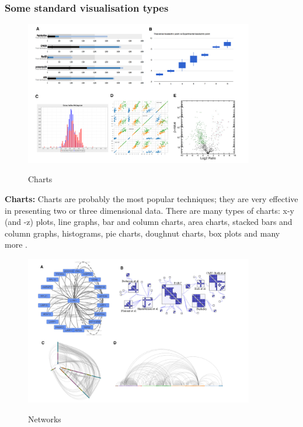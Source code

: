\documentclass[a4paper,11pt,titlepage]{article}
\begin{document}
		\par 

	\subsubsection{Some standard visualisation types}

	\begin{figure}[H]
    			\centering	
			{{\includegraphics[width=10cm]
    				{img/rui_wang_charts.png} 
    			}}%
    			\caption{Charts}%
    		\label{fig:illinsky}
	\end{figure}

 		
		\textbf{Charts:} Charts are probably the most popular techniques; they are very effective in presenting two or three dimensional data. There are many types of charts: x-y (and -z) plots, line graphs, bar and column charts, area charts, stacked bars and column graphs, histograms, pie charts, doughnut charts, box plots and many more \cite{Wang2015}. 

	\begin{figure}[H]
    			\centering	
			{{\includegraphics[width=10cm]
    				{img/rui_wang_networks.png} 
    			}}%
    			\caption{Networks}%
    		\label{fig:illinsky}
	\end{figure}
	
\end{document}
